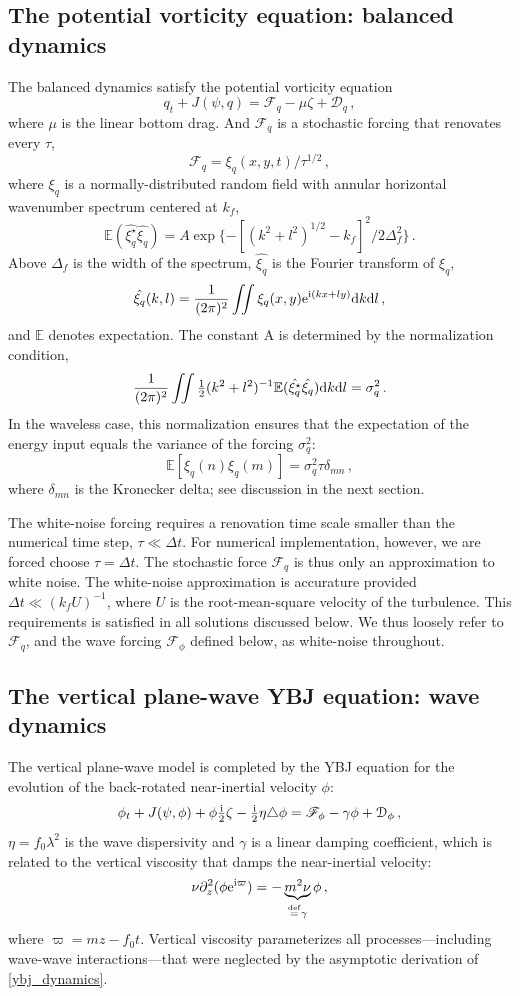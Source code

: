 \documentclass[12pt]{article}
\newcommand{\defn}{\ensuremath{\stackrel{\mathrm{def}}{=}}}
\newcommand{\per}{\, .}
\newcommand{\com}{\, ,}
\def\beq{\begin{equation}}
\def\eeq{\end{equation}}
\newcommand{\lap}{\triangle}
\newcommand{\half}{\tfrac{1}{2}}
\def\ii{{\rm i}}
\def\dd{{\rm d}}
\def\ee{{\rm e}}
\newcommand{\F}{{\mathscr{F}}}
\newcommand{\p}{\ensuremath{\partial}}
\newcommand{\?}{\stackrel{?}{=}}
\newcommand{\D}{\mathcal{D}}
\newcommand{\Hf}{\boldsymbol{\mathcal{H}}}
\newcommand{\disp}{\eta}
\newcommand{\ze}{\zeta}
\newcommand{\Es}{\mathbb{E}}
\begin{document}
\subsection{The potential vorticity equation: balanced dynamics}
The balanced dynamics satisfy the potential vorticity equation
\beq
q_t + J(\psi,q)  = \F_q -\mu \zeta + \D_q \com
\label{balanced_dynamics}
\eeq
where $\mu$ is the linear bottom drag. And $\F_q$ is a
stochastic forcing that renovates every $\tau$,
\renewcommand{\Hf}{\mathcal{H}}
\beq
\label{F_q}
\F_q = \xi_q(x,y,t)/\tau^{1/2}\com
\eeq
where $\xi_q$ is a normally-distributed random field with annular horizontal wavenumber spectrum
centered at $k_f$,
\beq
\label{spec_forcing}
\Es(\hat{\xi_q^\star}\hat{\xi_q}) =  A \exp\big\{{-[(k^2+l^2)^{1/2}-k_f]^2/2\Delta_f^2}\big\}\per
\eeq
Above $\Delta_f$ is the width of the spectrum, $\hat{\xi_q}$ is the Fourier transform of $\xi_q$,
\beq
\hat{\xi_q}(k,l) = \frac{1}{(2\pi)^2}\iint \xi_q(x,y)\ee^{\ii(kx + ly)}\dd k \dd l\com
\eeq
and $\Es$ denotes expectation. The constant A is determined by the normalization condition,
\beq
\label{norm_fq}
\frac{1}{(2\pi)^2}\iint\half(k^2 + l^2)^{-1}\Es(\hat{\xi_q^\star}\hat{\xi_q}) \dd k \dd l= \sigma_q^2\per
\eeq
In the waveless case, this normalization ensures that
the expectation of the energy input equals the variance of the forcing $\sigma_q^2$:
\beq
\Es[\xi_q(n)\xi_q(m)]= \sigma_q^2 \tau \delta_{mn}\com
\eeq
where $\delta_{mn}$ is the Kronecker delta; see discussion in the next section.

The white-noise forcing requires a renovation time scale smaller than
the numerical time step, $\tau \ll \Delta t$. For numerical implementation,
however, we are forced choose $\tau = \Delta t$. The stochastic force $\F_q$
is thus only an approximation to white noise. The white-noise approximation is
accurature provided $\Delta t \ll (k_f U)^{-1}$, where $U$ is the root-mean-square
velocity of the turbulence. This requirements is satisfied in all solutions discussed
below. We thus loosely refer to $\F_q$, and
the wave forcing $\F_\phi$ defined below, as white-noise throughout.

\subsection{The vertical plane-wave YBJ equation: wave dynamics}
The vertical plane-wave model is completed by the YBJ equation for the evolution
of the back-rotated near-inertial velocity $\phi$:
\beq
\phi_t + J(\psi,\phi) +  \phi \tfrac{\ii}{2}\ze - \tfrac{\ii}{2} \disp \lap \phi
 = \F_\phi -\gamma \phi + \D_\phi\com
 \label{ybj_dynamics}
\eeq
$\eta = f_0\lambda^2$ is the wave dispersivity and  $\gamma$
is a linear damping coefficient, which is related to the vertical viscosity
that damps the near-inertial velocity:
\beq
\nu \p_z^2(\phi \ee^{\ii \varpi}) = - \underbrace{m^2\nu}_{\defn \gamma}\phi\com
\eeq
where $\varpi = mz - f_0 t$. Vertical viscosity parameterizes
all processes---including wave-wave interactions---that were neglected by the
asymptotic derivation of \eqref{ybj_dynamics}.
\end{document}
